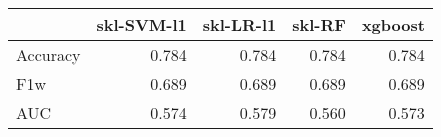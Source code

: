 \begin{tabular}{lrrrr}
\toprule
{} &  skl-SVM-l1 &  skl-LR-l1 &  skl-RF &  xgboost \\
\midrule
Accuracy &       0.784 &      0.784 &   0.784 &    0.784 \\
F1w      &       0.689 &      0.689 &   0.689 &    0.689 \\
AUC      &       0.574 &      0.579 &   0.560 &    0.573 \\
\bottomrule
\end{tabular}
